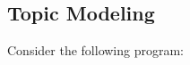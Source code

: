 \documentclass[10pt]{article}
\begin{document}
%
%
%
%
%

\subsection{Topic Modeling}

Consider the following program:

%
%
%
\end{document}
